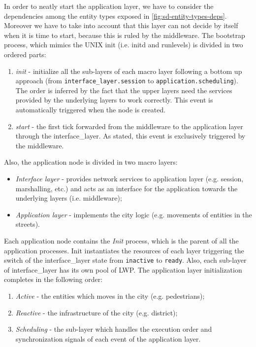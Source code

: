 In order to neatly start the application layer, we have to consider the
dependencies among the entity types exposed in \ref{fig:sd-entity-types-deps}.
Moreover we have to take into account that this layer can not decide by itself
when it is time to start, because this is ruled by the middleware.
The bootstrap process, which mimics the UNIX init (i.e. initd and runlevels)
is divided in two ordered parts:
\begin{enumerate}
	\item \textit{init} - initialize all the sub-layers of each macro layer
	following a bottom up approach (from \verb|interface_layer.session| to \verb|application.scheduling|). The order is inferred by the fact that the upper
	layers need the services provided by the underlying layers to work
	correctly. This event is automatically triggered when the node is created.
	\item \textit{start} - the first tick forwarded from the middleware to the
	application layer through the interface\_layer. As stated, this event is
	exclusively triggered by the middleware.
\end{enumerate}
Also, the application node is divided in two macro layers:
\begin{itemize}
	\item \textit{Interface layer} - provides network services to
	application layer (e.g. session, marshalling, etc.) and acts as an interface
	for the application towards the underlying layers (i.e. middleware);
	\item \textit{Application layer} - implements the city logic
	(e.g. movements of entities in the streets).
\end{itemize}
Each application node contains the \textit{Init} process,
which is the parent of all the application processes.
Init instantiates the resources of each layer triggering the switch of the
interface\_layer state from \verb|inactive| to \verb|ready|.
Also, each sub-layer of interface\_layer has its own pool of LWP.
The application layer initialization completes in the following order:
\begin{enumerate}
	\item \textit{Active} - the entities which moves in the city (e.g. pedestrians);
	\item \textit{Reactive} - the infrastructure of the city (e.g. district);
	\item \textit{Scheduling} - the sub-layer which handles the execution order and
	synchronization signals of each event of the application layer.
\end{enumerate}
